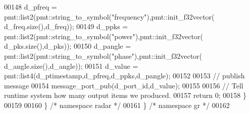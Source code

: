 \begin{DoxyCode}
00148         d_pfreq = pmt::list2(pmt::string\_to\_symbol(\textcolor{stringliteral}{"frequency"}),pmt::init\_f32vector(
      d_freq.size(),d_freq));
00149         d_ppks = pmt::list2(pmt::string\_to\_symbol(\textcolor{stringliteral}{"power"}),pmt::init\_f32vector(
      d_pks.size(),d_pks));
00150         d_pangle = pmt::list2(pmt::string\_to\_symbol(\textcolor{stringliteral}{"phase"}),pmt::init\_f32vector(
      d_angle.size(),d_angle));
00151         d_value = pmt::list4(d_ptimestamp,d_pfreq,d_ppks,d_pangle);
00152         
00153         \textcolor{comment}{// publish message}
00154         message\_port\_pub(d_port_id,d_value);
00155 
00156         \textcolor{comment}{// Tell runtime system how many output items we produced.}
00157         \textcolor{keywordflow}{return} 0;
00158     \}
00159 
00160   \} \textcolor{comment}{/* namespace radar */}
00161 \} \textcolor{comment}{/* namespace gr */}
00162 
\end{DoxyCode}
